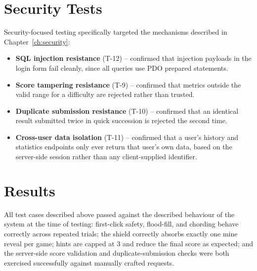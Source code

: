 \section{Security Tests}
Security-focused testing specifically targeted the mechanisms described in
Chapter~\ref{ch:security}:
\begin{itemize}[nosep]
    \item \textbf{SQL injection resistance} (T-12) -- confirmed that
    injection payloads in the login form fail cleanly, since all queries use
    PDO prepared statements.
    \item \textbf{Score tampering resistance} (T-9) -- confirmed that
    metrics outside the valid range for a difficulty are rejected rather
    than trusted.
    \item \textbf{Duplicate submission resistance} (T-10) -- confirmed that
    an identical result submitted twice in quick succession is rejected the
    second time.
    \item \textbf{Cross-user data isolation} (T-11) -- confirmed that a
    user's history and statistics endpoints only ever return that user's own
    data, based on the server-side session rather than any client-supplied
    identifier.
\end{itemize}

\section{Results}
All test cases described above passed against the described behaviour of
the system at the time of testing: first-click safety, flood-fill, and
chording behave correctly across repeated trials; the shield correctly
absorbs exactly one mine reveal per game; hints are capped at 3 and reduce
the final score as expected; and the server-side score validation and
duplicate-submission checks were both exercised successfully against
manually crafted requests.
